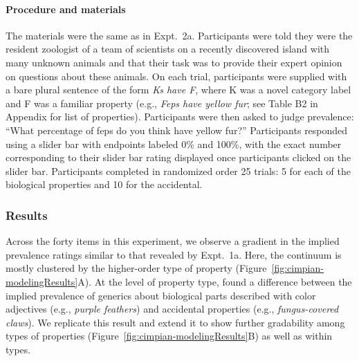 \documentclass[floatsintext,doc]{apa6}
\let\oldparagraph\paragraph
\renewcommand{\paragraph}[1]{\oldparagraph{#1}\mbox{}}
\newcommand{\ndg}[1]{{\textcolor{Green}{[ndg: #1]}}}
\begin{document}
\paragraph{Procedure and materials}
The materials were the same as in Expt.~2a.
Participants were told they were the resident zoologist of a team of scientists on a recently discovered island with many unknown animals and that their task was to provide their expert opinion on questions about these animals.
On each trial, participants were supplied with a bare plural sentence of the form \emph{Ks have F}, where K was a novel category label and F was a familiar property (e.g., \emph{Feps have yellow fur}; see Table B2 in Appendix for list of properties).
Participants were then asked to judge prevalence: \enquote{What percentage of feps do you think have yellow fur?}
Participants responded using a slider bar with endpoints labeled 0\% and 100\%, with the exact number corresponding to their slider bar rating displayed once participants clicked on the slider bar.
Participants completed in randomized order 25 trials: 5 for each of the biological properties and 10 for the accidental.

\hypertarget{results-and-discussion}{%
\subsubsection{Results}\label{results-and-discussion}}

Across the forty items in this experiment, we observe a gradient in the implied prevalence ratings similar to that revealed by Expt.~1a. Here, the continuum is mostly clustered by the higher-order type of property (Figure~\ref{fig:cimpian-modelingResults}A).
At the level of property type,  found a difference between the implied prevalence of generics about biological parts described with color adjectives (e.g., \emph{purple feathers}) and accidental properties (e.g., \emph{fungus-covered claws}).
We replicate this result and extend it to show further gradability among types of properties (Figure~\ref{fig:cimpian-modelingResults}B) as well as within types.
\end{document}
